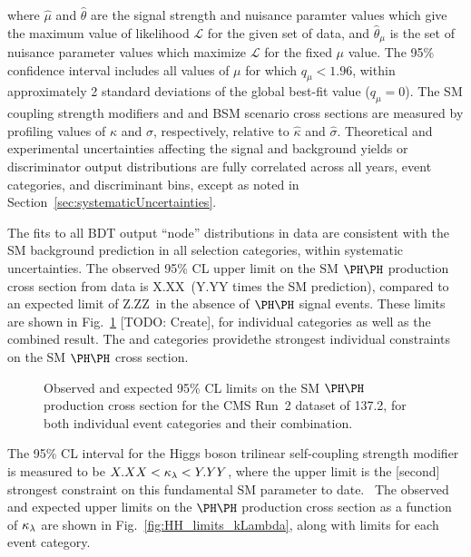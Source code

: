 where $\hat{\mu}$ and $\hat{\theta}$ are the signal strength and nuisance
paramter values which give the maximum value of likelihood $\mathcal{L}$
for the given set of data, and $\hat{\theta}_{\mu}$ is the set of nuisance
parameter values which maximize $\mathcal{L}$ for the fixed $\mu$ value.
The 95\% confidence interval includes all values of $\mu$ for which $q_{\mu} < 1.96$,
within approximately 2 standard deviations of the global best-fit value ($q_{\mu} = 0$).
The SM coupling strength modifiers and and BSM scenario cross sections
are measured by profiling values of $\kappa$ and $\sigma$, respectively,
relative to $\hat{\kappa}$ and $\hat{\sigma}$.
Theoretical and experimental uncertainties affecting the signal and
background yields or discriminator output distributions are fully
correlated across all years, event categories, and discriminant bins,
except as noted in Section~\ref{sec:systematicUncertainties}.

The fits to all BDT output ``node'' distributions in data are consistent with the
SM background prediction in all selection categories, within systematic uncertainties.
The observed 95\% CL upper limit on the SM $\HH$ production cross section
from data is X.XX~\pb (Y.YY times the SM prediction), compared to an
expected limit of Z.ZZ~\pb in the absence of $\HH$ signal events.
These limits are shown in Fig.~\ref{fig:HH_limits_SM} [TODO: Create],
for individual categories as well as the combined result.
The \lttt and \lllnot categories providethe strongest individual
constraints on the SM $\HH$ cross section.

\begin{figure}
  \centering
  \caption{
    Observed and expected 95\% CL limits on the SM $\HH$ production cross section
    for the CMS Run~2 dataset of 137.2\fbinv, for both individual event categories
    and their combination.
  }
  \label{fig:HH_limits_SM}
\end{figure}

The 95\% CL interval for the Higgs boson trilinear self-coupling strength modifier
is measured to be $X.XX < \kappa_{\lambda} < Y.YY$, where the upper limit is the [second]
strongest constraint on this fundamental SM parameter to date.~\cite{Sirunyan:2745738,Sirunyan:2018ayu,2020135103}
The observed and expected upper limits on the $\HH$ production cross section as a function of
$\kappa_{\lambda}$ are shown in Fig.~\ref{fig:HH_limits_kLambda}, along with limits for each event category.

